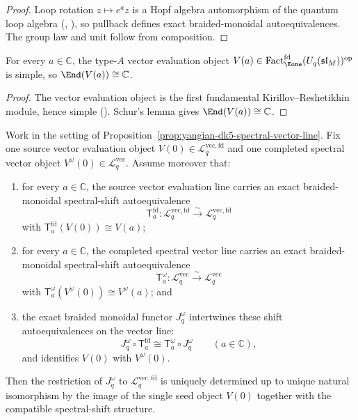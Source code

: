 \begin{proof}
Loop rotation \(z\mapsto e^a z\) is a Hopf algebra automorphism of the
quantum loop algebra (\cite[Ch.~12]{ChariPressley94},
\cite[\S2]{Hernandez05}), so pullback defines exact braided-monoidal
autoequivalences.  The group law and unit follow from composition.
\end{proof}

\begin{lemma}
\label{lem:quantum-fd-vector-seed-schur}
For every \(a\in\mathbb C\), the type-$A$ vector evaluation object
\(V(a)\in \operatorname{Fact}_{\Eone}^{\mathrm{fd}}(U_q(\mathfrak{sl}_M))^{\mathrm{op}}\)
is simple, so \(\End(V(a))\cong \mathbb C\).
\end{lemma}

\begin{proof}
The vector evaluation object is the first fundamental
Kirillov--Reshetikhin module, hence simple (\cite[Ch.~12]{ChariPressley94}).
Schur's lemma gives \(\End(V(a))\cong\mathbb C\).
\end{proof}

\begin{proposition}
\label{prop:yangian-dk5-spectral-vector-seed}
Work in the setting of
Proposition~\ref{prop:yangian-dk5-spectral-vector-line}.  Fix one
source vector evaluation object \(V(0)\in
\mathcal{L}^{\mathrm{vec,fd}}_{q}\) and one completed spectral vector
object \(V^\omega(0)\in \mathcal{L}^{\mathrm{vec}}_{q}\).  Assume
moreover that:
\begin{enumerate}[label=\textup{(\roman*)}]
\item for every \(a\in \mathbb{C}\), the source vector evaluation line
  carries an exact braided-monoidal spectral-shift autoequivalence
  \[
  \mathsf{T}^{\mathrm{fd}}_a\colon
  \mathcal{L}^{\mathrm{vec,fd}}_{q}\xrightarrow{\sim}
  \mathcal{L}^{\mathrm{vec,fd}}_{q}
  \]
  with \(\mathsf{T}^{\mathrm{fd}}_a(V(0))\cong V(a)\);
\item for every \(a\in \mathbb{C}\), the completed spectral vector line
  carries an exact braided-monoidal spectral-shift autoequivalence
  \[
  \mathsf{T}^{\omega}_a\colon
  \mathcal{L}^{\mathrm{vec}}_{q}\xrightarrow{\sim}
  \mathcal{L}^{\mathrm{vec}}_{q}
  \]
  with \(\mathsf{T}^{\omega}_a(V^\omega(0))\cong V^\omega(a)\); and
\item the exact braided monoidal functor \(J_q^\omega\) intertwines
  these shift autoequivalences on the vector line:
  \[
  J_q^\omega\circ \mathsf{T}^{\mathrm{fd}}_a
  \cong
  \mathsf{T}^{\omega}_a\circ J_q^\omega
  \qquad (a\in \mathbb{C}),
  \]
  and identifies \(V(0)\) with \(V^\omega(0)\).
\end{enumerate}
Then the restriction of \(J_q^\omega\) to
\(\mathcal{L}^{\mathrm{vec,fd}}_{q}\) is uniquely determined up to
unique natural isomorphism by the image of the single seed object
\(V(0)\) together with the compatible spectral-shift structure.
\end{proposition}

